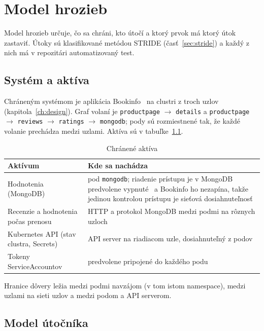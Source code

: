 \chapter{Model hrozieb}
\label{ch:threat-model}

Model hrozieb určuje, čo sa chráni, kto útočí a ktorý prvok má ktorý útok zastaviť. Útoky sú klasifikované metódou STRIDE (časť~\ref{sec:stride}) a každý z nich má v repozitári automatizovaný test.

\section{Systém a aktíva}

Chráneným systémom je aplikácia Bookinfo~\cite{istio-bookinfo} na clustri z troch uzlov (kapitola~\ref{ch:design}). Graf volaní je
\texttt{productpage} $\rightarrow$ \texttt{details} a \texttt{productpage} $\rightarrow$ \texttt{reviews} $\rightarrow$ \texttt{ratings} $\rightarrow$ \texttt{mongodb}; pody sú rozmiestnené tak, že každé volanie prechádza medzi uzlami. Aktíva sú v tabuľke~\ref{tab:assets}.

\begin{table}[ht!]
  \centering
  \caption{Chránené aktíva}
  \label{tab:assets}
  \footnotesize
  \renewcommand{\arraystretch}{1.15}
  \begin{tabularx}{\textwidth}{@{}>{\raggedright\arraybackslash}p{4.6cm}>{\raggedright\arraybackslash}X@{}}
    \toprule
    Aktívum & Kde sa nachádza \\
    \midrule
    Hodnotenia (MongoDB) & pod \texttt{mongodb}; riadenie prístupu je v MongoDB predvolene vypnuté~\cite{mongodb} a Bookinfo ho nezapína, takže jedinou kontrolou prístupu je sieťová dosiahnuteľnosť \\
    Recenzie a hodnotenia počas prenosu & HTTP a protokol MongoDB medzi podmi na rôznych uzloch \\
    Kubernetes API (stav clustra, Secrets) & API server na riadiacom uzle, dosiahnuteľný z podov \\
    Tokeny ServiceAccountov & predvolene pripojené do každého podu \\
    \bottomrule
  \end{tabularx}
\end{table}

Hranice dôvery ležia medzi podmi navzájom (v tom istom namespace), medzi uzlami na sieti uzlov a medzi podom a API serverom.

\section{Model útočníka}


